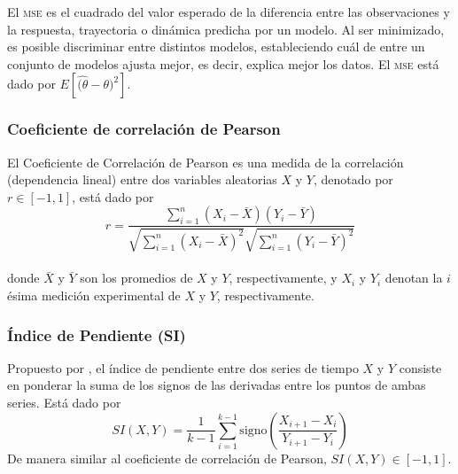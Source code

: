 El \textsc{mse} \citep{msewiki} es el cuadrado del valor esperado de la diferencia entre las observaciones y la respuesta, trayectoria o dinámica predicha por un modelo. Al ser minimizado, es posible discriminar entre distintos modelos, estableciendo cuál de entre un conjunto de modelos ajusta mejor, es decir, explica mejor los datos. El \textsc{mse} está dado por $E[\hat{(\theta} - \theta)^2]$.

\subsubsection{Coeficiente de correlación de Pearson}

El Coeficiente de Correlación de Pearson \citep{pearsoncorrwiki} es una medida de la correlación (dependencia lineal) entre dos variables aleatorias $X$ y $Y$, denotado por $r \in [-1, 1]$, está dado por
\begin{equation} 
r = \frac{\sum_{i=1}^n (X_i - \bar{X})(Y_i - \bar{Y})} {\sqrt{\sum_{i=1}^n (X_i - \bar{X})^2} \sqrt{\sum_{i=1}^n (Y_i - \bar{Y})^2}}
\end{equation}
\\
donde $\bar{X}$ y $\bar{Y}$ son los promedios de $X$ y $Y$, respectivamente, y $X_i$ y $Y_i$ denotan la $i$ésima medición experimental de $X$ y $Y$, respectivamente.

\subsubsection{Índice de Pendiente (SI)}

Propuesto por \citeauthor{Cho2006} \citep{Cho2006}, el índice de pendiente entre dos series de tiempo $X$ y $Y$ consiste en ponderar la suma de los signos de las derivadas entre los puntos de ambas series. Está dado por 
\begin{equation}
SI(X,Y) = \frac{1}{k - 1} \sum_{i=1}^{k-1} \mathrm{signo} \left(\frac{X_{i+1} - X_i} {Y_{i+1} - Y_i}\right)
\end{equation}
De manera similar al coeficiente de correlación de Pearson, $SI(X,Y)\in [-1, 1]$. 

